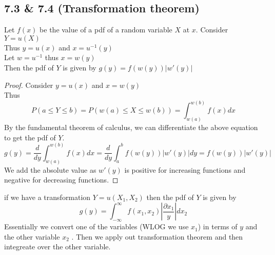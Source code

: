 \documentclass[answers,12pt,addpoints]{exam}
\begin{document}
\subsection{7.3 \& 7.4 (Transformation theorem)}
\begin{definition}
    Let $f(x)$ be the value of a pdf of a random variable $X$ at $x$. Consider $Y = u(X)$ \\
    Thus $y = u(x)$ and $x = u^{-1}(y)$\\
    Let $w = u^{-1}$ thus $x = w(y)$\\
    Then the pdf of $Y$ is given by $g(y) = f(w(y)) |w'(y)|$
    \begin{proof}
        Consider $y = u(x)$ and $x = w(y)$\\
        Thus 
        $$ P(a \leq Y \leq b) = P(w(a) \leq X \leq w(b)) = \int_{w(a)}^{w(b)} f(x) dx$$
        By the fundamental theorem of calculus, we can differentiate the above equation to get the pdf of $Y$.
        $$ g(y) = \frac{d}{dy} \int_{w(a)}^{w(b)} f(x) dx = \frac{d}{dy} \int_a^b f(w(y)) |w'(y)| dy = f(w(y)) |w'(y)|$$
        We add the absolute value as $w'(y)$ is positive for increasing functions and negative for decreasing functions.
    \end{proof}
\end{definition}
\begin{definition}
    if we have a transformation $Y = u(X_1, X_2)$ then the pdf of $Y$ is given by
    $$ g(y) = \int_{-\infty}^{\infty} f(x_1, x_2) \left| \frac{\partial x_1}{y} \right| dx_2$$
    Essentially we convert one of the variables (WLOG we use $x_1$) in terms of $y$ and the other variable $x_2$ . Then we apply out transformation theorem and then integreate over the other variable.
\end{definition}
\end{document}

